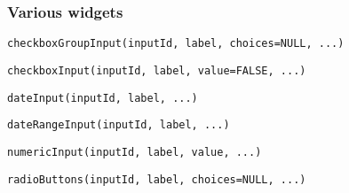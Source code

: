 \documentclass{beamer}
\begin{document}
	\begin{frame}[fragile]
		\frametitle{Various widgets}

		\begin{exampleblock}{}
		\begin{BVerbatim}
checkboxGroupInput(inputId, label, choices=NULL, ...)
		\end{BVerbatim}
		\end{exampleblock}{}

		\vspace{1em}

		\begin{exampleblock}{}
		\begin{BVerbatim}
checkboxInput(inputId, label, value=FALSE, ...)
		\end{BVerbatim}
		\end{exampleblock}{}

		\vspace{1em}

		\begin{exampleblock}{}
		\begin{BVerbatim}
dateInput(inputId, label, ...)
		\end{BVerbatim}
		\end{exampleblock}{}

		\vspace{1em}

		\begin{exampleblock}{}
		\begin{BVerbatim}
dateRangeInput(inputId, label, ...)
		\end{BVerbatim}
		\end{exampleblock}{}

		\vspace{1em}

		\begin{exampleblock}{}
		\begin{BVerbatim}
numericInput(inputId, label, value, ...)
		\end{BVerbatim}
		\end{exampleblock}{}

		\vspace{1em}

		\begin{exampleblock}{}
		\begin{BVerbatim}
radioButtons(inputId, label, choices=NULL, ...)
		\end{BVerbatim}
		\end{exampleblock}{}

	\end{frame}
\end{document}
